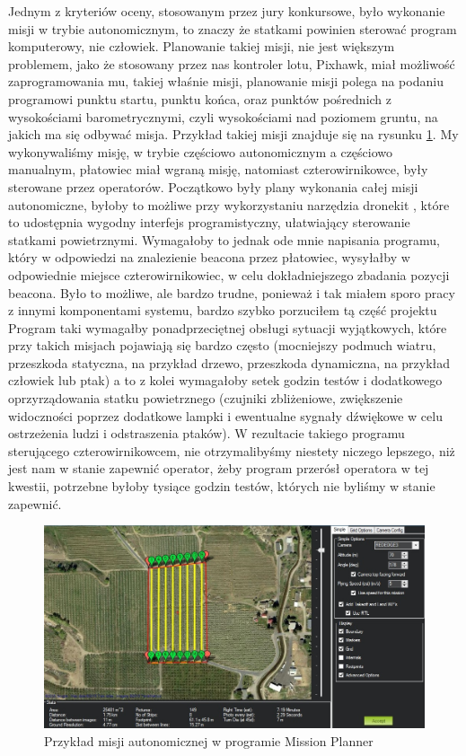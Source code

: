Jednym z kryteriów oceny, stosowanym przez jury konkursowe, było wykonanie misji w trybie autonomicznym, to znaczy że statkami powinien sterować program komputerowy, nie człowiek. Planowanie takiej misji, nie jest większym problemem, jako że stosowany przez nas kontroler lotu, Pixhawk, miał możliwość zaprogramowania mu, takiej właśnie misji, planowanie misji polega na podaniu programowi punktu startu, punktu końca, oraz punktów pośrednich z wysokościami barometrycznymi, czyli wysokościami nad poziomem gruntu, na jakich ma się odbywać misja. Przykład takiej misji znajduje się na rysunku \ref{fig:misja}. My wykonywaliśmy misję, w trybie częściowo autonomicznym a częściowo manualnym, płatowiec miał wgraną misję, natomiast czterowirnikowce, były sterowane przez operatorów. Początkowo były plany wykonania całej misji autonomiczne, byłoby to możliwe przy wykorzystaniu narzędzia dronekit \cite{dronekit}, które to udostępnia wygodny interfejs programistyczny, ułatwiający sterowanie statkami powietrznymi. Wymagałoby to jednak ode mnie napisania programu, który w odpowiedzi na znalezienie beacona przez płatowiec, wysyłałby w odpowiednie miejsce czterowirnikowiec, w celu dokładniejszego zbadania pozycji beacona. Było to możliwe, ale bardzo trudne, ponieważ i tak miałem sporo pracy z innymi komponentami systemu, bardzo szybko porzuciłem tą część projektu Program taki wymagałby ponadprzeciętnej obsługi sytuacji wyjątkowych, które przy takich misjach pojawiają się bardzo często (mocniejszy podmuch wiatru, przeszkoda statyczna, na przykład drzewo, przeszkoda dynamiczna, na przykład człowiek lub ptak) a to z kolei wymagałoby setek godzin testów i dodatkowego oprzyrządowania statku powietrznego (czujniki zbliżeniowe, zwiększenie widoczności poprzez dodatkowe lampki i ewentualne sygnały dźwiękowe w celu ostrzeżenia ludzi i odstraszenia ptaków). W rezultacie takiego programu sterującego czterowirnikowcem, nie otrzymalibyśmy niestety niczego lepszego, niż jest nam w stanie zapewnić operator, żeby program przerósł operatora w tej kwestii, potrzebne byłoby tysiące godzin testów, których nie byliśmy w stanie zapewnić.

\begin{figure}[!th]
    \centering
    \includegraphics[width=15cm]{zalaczniki/obrazy/misja.jpg}
    \caption{Przykład misji autonomicznej w programie Mission Planner}
    \label{fig:misja}
\end{figure}

